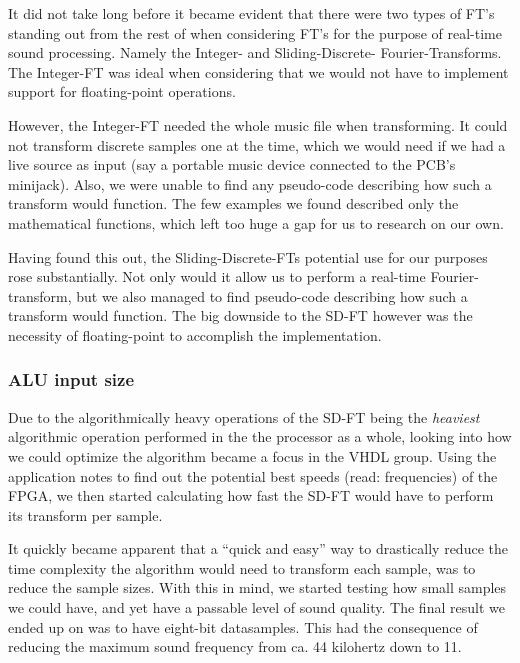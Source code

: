 It did not take long before it became evident that there were two types of FT's
standing out from the rest of when considering FT's for the purpose of real-time
sound processing. Namely the Integer- and Sliding-Discrete- Fourier-Transforms.
The Integer-FT was ideal when considering that we would not have to implement
support for floating-point operations.

However, the Integer-FT needed the whole music file when transforming. It could
not transform discrete samples one at the time, which we would need if we had a
live source as input (say a portable music device connected to the PCB's
minijack). Also, we were unable to find any pseudo-code describing how such a
transform would function. The few examples we found described only the
mathematical functions, which left too huge a gap for us to research on our own.

Having found this out, the Sliding-Discrete-FTs potential use for our purposes
rose substantially. Not only would it allow us to perform a real-time
Fourier-transform, but we also managed to find pseudo-code describing how such a
transform would function. The big downside to the SD-FT however was the
necessity of floating-point to accomplish the implementation.

\subsubsection{ALU input size}

Due to the algorithmically heavy operations of the SD-FT being the
\emph{heaviest} algorithmic operation performed in the the processor as a whole,
looking into how we could optimize the algorithm became a focus in the VHDL
group. Using the application notes to find out the potential best speeds (read:
frequencies) of the FPGA, we then started calculating how fast the SD-FT would
have to perform its transform per sample.

It quickly became apparent that a ``quick and easy'' way to drastically reduce
the time complexity the algorithm would need to transform each sample, was to
reduce the sample sizes. With this in mind, we started testing how
small samples we could have, and yet have a passable level of sound quality. The
final result we ended up on was to have eight-bit datasamples. This had the
consequence of reducing the maximum sound frequency from ca. 44 kilohertz down
to 11.

